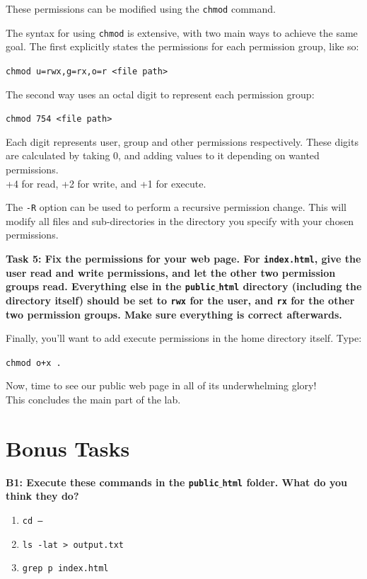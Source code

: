 \documentclass[a4paper,11pt,parskip=half-]{scrartcl}
\begin{document}
These permissions can be modified using the \texttt{chmod} command.

The syntax for using \texttt{chmod} is extensive, with two main ways to achieve the same goal. 
The first explicitly states the permissions for each permission group, like so:

\qquad \texttt{chmod u=rwx,g=rx,o=r <file path>}

The second way uses an octal digit to represent each permission group:

\qquad \texttt{chmod 754 <file path>} 

Each digit represents user, group and other permissions respectively. 
These digits are calculated by taking 0, and adding values to it depending on wanted permissions. \\
+4 for read, +2 for write, and +1 for execute.

The \texttt{-R} option can be used to perform a recursive permission change. 
This will modify all files and sub-directories in the directory you specify with your chosen permissions.

\bfseries Task 5: \normalfont 
Fix the permissions for your web page. 
For \texttt{index.html}, give the user read and write permissions, and let the other two permission groups read. 
Everything else in the \texttt{public$\_$html} directory (including the directory itself) should be set to \texttt{rwx} for the user, and \texttt{rx} for the other two permission groups. 
Make sure everything is correct afterwards.

Finally, you'll want to add execute permissions in the home directory itself. Type:

\qquad \texttt{chmod o+x .}

Now, time to see our public web page in all of its underwhelming glory! \\ 
This concludes the main part of the lab.

\section*{Bonus Tasks}

\bfseries B1: \normalfont 
Execute these commands in the \texttt{public$\_$html} folder. 
What do you think they do?

\begin{enumerate}
    \item \large \texttt{cd --} \normalsize
    \item \large \texttt{ls -lat > output.txt} \normalsize
    \item \large \texttt{grep p index.html} \normalsize
\end{enumerate}
\end{document}

